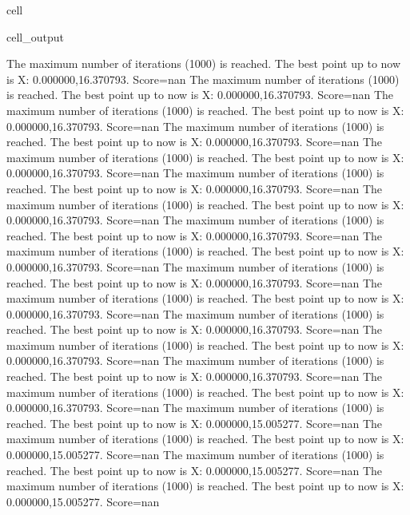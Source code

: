 \documentclass[letterpaper,10pt,english]{jupyterBook}
\begin{document}
\begin{sphinxuseclass}{cell}
\begin{sphinxVerbatimOutput}
\begin{sphinxuseclass}{cell_output}
\begin{sphinxVerbatim}[commandchars=\\\{\}]
The maximum number of iterations (1000) is reached. The best point up to now is X: \PYGZob{}0.000000,16.370793\PYGZcb{}. Score=\PYGZhy{}nan
The maximum number of iterations (1000) is reached. The best point up to now is X: \PYGZob{}0.000000,16.370793\PYGZcb{}. Score=\PYGZhy{}nan
The maximum number of iterations (1000) is reached. The best point up to now is X: \PYGZob{}0.000000,16.370793\PYGZcb{}. Score=\PYGZhy{}nan
The maximum number of iterations (1000) is reached. The best point up to now is X: \PYGZob{}0.000000,16.370793\PYGZcb{}. Score=\PYGZhy{}nan
The maximum number of iterations (1000) is reached. The best point up to now is X: \PYGZob{}0.000000,16.370793\PYGZcb{}. Score=\PYGZhy{}nan
The maximum number of iterations (1000) is reached. The best point up to now is X: \PYGZob{}0.000000,16.370793\PYGZcb{}. Score=\PYGZhy{}nan
The maximum number of iterations (1000) is reached. The best point up to now is X: \PYGZob{}0.000000,16.370793\PYGZcb{}. Score=\PYGZhy{}nan
The maximum number of iterations (1000) is reached. The best point up to now is X: \PYGZob{}0.000000,16.370793\PYGZcb{}. Score=\PYGZhy{}nan
The maximum number of iterations (1000) is reached. The best point up to now is X: \PYGZob{}0.000000,16.370793\PYGZcb{}. Score=\PYGZhy{}nan
The maximum number of iterations (1000) is reached. The best point up to now is X: \PYGZob{}0.000000,16.370793\PYGZcb{}. Score=\PYGZhy{}nan
The maximum number of iterations (1000) is reached. The best point up to now is X: \PYGZob{}0.000000,16.370793\PYGZcb{}. Score=\PYGZhy{}nan
The maximum number of iterations (1000) is reached. The best point up to now is X: \PYGZob{}0.000000,16.370793\PYGZcb{}. Score=\PYGZhy{}nan
The maximum number of iterations (1000) is reached. The best point up to now is X: \PYGZob{}0.000000,16.370793\PYGZcb{}. Score=\PYGZhy{}nan
The maximum number of iterations (1000) is reached. The best point up to now is X: \PYGZob{}0.000000,16.370793\PYGZcb{}. Score=\PYGZhy{}nan
The maximum number of iterations (1000) is reached. The best point up to now is X: \PYGZob{}0.000000,16.370793\PYGZcb{}. Score=\PYGZhy{}nan
The maximum number of iterations (1000) is reached. The best point up to now is X: \PYGZob{}0.000000,15.005277\PYGZcb{}. Score=\PYGZhy{}nan
The maximum number of iterations (1000) is reached. The best point up to now is X: \PYGZob{}0.000000,15.005277\PYGZcb{}. Score=\PYGZhy{}nan
The maximum number of iterations (1000) is reached. The best point up to now is X: \PYGZob{}0.000000,15.005277\PYGZcb{}. Score=\PYGZhy{}nan
The maximum number of iterations (1000) is reached. The best point up to now is X: \PYGZob{}0.000000,15.005277\PYGZcb{}. Score=\PYGZhy{}nan

\end{sphinxVerbatim}
\end{sphinxuseclass}
\end{sphinxVerbatimOutput}
\end{sphinxuseclass}
\end{document}
